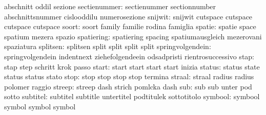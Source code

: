                            abschnitt                 oddil
                           sezione
             sectienummer: sectienummer              sectionnumber
                           abschnittsnummer          cislooddilu
                           numerosezione
                  snijwit: snijwit                   cutspace
                           cutspace                  cutspace
                           cutspace                  %
                    soort: soort                     family
                           familie                   rodina
                           famiglia
                   spatie: spatie                    space
                           spatium                   mezera
                           spazio
               spatiering: spatiering                spacing
                           spatiumausgleich          mezerovani
                           spaziatura
                 splitsen: splitsen                  split
                           split                     split
                           split                     %
         springvolgendein: springvolgendein          indentnext
                           ziehefolgendeein          odsadpristi
                           rientrosuccessivo
                     stap: stap                      step
                           schritt                   krok
                           passo
                    start: start                     start
                           start                     start
                           inizia
                   status: status                    state
                           status                    status
                           stato
                     stop: stop                      stop
                           stop                      stop
                           termina
                   straal: straal                    radius
                           radius                    polomer
                           raggio
                   streep: streep                    dash
                           strich                    pomlcka
                           dash                      %
                      sub: sub                       sub
                           unter                     pod
                           sotto
                 subtitel: subtitel                  subtitle
                           untertitel                podtitulek
                           sottotitolo
                  symbool: symbool                   symbol
                           symbol                    symbol
